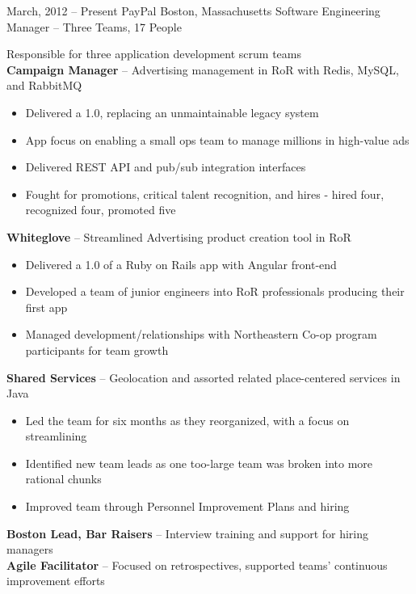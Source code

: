\documentclass[]{friggeri-cv}
\begin{document}
\begin{entrylist}
  \entryalt
    {March, 2012 -- Present}
    {PayPal}
    {Boston, Massachusetts}
    {Software Engineering Manager -- Three Teams, 17 People}
    {Responsible for three application development scrum teams \\
      \textbf{Campaign Manager} -- Advertising management in RoR with Redis, MySQL,
      and RabbitMQ
    \begin{itemize}
      \item Delivered a 1.0, replacing an unmaintainable legacy system
      \item App focus on enabling a small ops team to manage millions in
        high-value ads
      \item Delivered REST API and pub/sub integration interfaces
      \item Fought for promotions, critical talent recognition, and hires - hired four, recognized four, promoted five
    \end{itemize}
      \textbf{Whiteglove} -- Streamlined Advertising product creation tool in RoR
    \begin{itemize}
      \item Delivered a 1.0 of a Ruby on Rails app with Angular front-end
      \item Developed a team of junior engineers into RoR professionals producing their first app
      \item Managed development/relationships with Northeastern Co-op program
        participants for team growth
    \end{itemize} 
      \textbf{Shared Services} -- Geolocation and assorted related place-centered
      services in Java
    \begin{itemize}
      \item Led the team for six months as they reorganized, with a focus on
        streamlining
      \item Identified new team leads as one too-large team was broken
        into more rational chunks
      \item Improved team through Personnel Improvement Plans and hiring
    \end{itemize}
    \textbf{Boston Lead, Bar Raisers} -- Interview training and support for hiring managers\\
    \textbf{Agile Facilitator} -- Focused on retrospectives, supported teams' continuous improvement efforts}


\end{entrylist}
\end{document}
